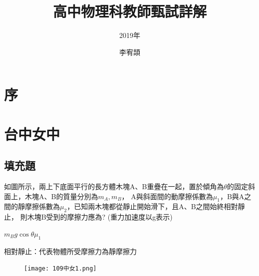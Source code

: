 \documentclass[cn,10pt,math=newtx,chinesefont=founder,device=ig]{elegantbook}
\title{高中物理科教師甄試詳解}
\subtitle{2019年}
\author{李宥頡}
\institute{National Taiwan University}
\begin{document}
\maketitle
\frontmatter

\chapter*{序}



\tableofcontents

\mainmatter

\chapter{台中女中}


\section{填充題}

\begin{example}
  如圖所示，兩上下底面平行的長方體木塊A、B重疊在一起，置於傾角為$\theta$的固定斜面上，木塊A、B的質量分別為$m_A, m_B$，
  A與斜面間的動摩擦係數為$\mu_1$，B與A之間的靜摩擦係數為$\mu_2$，已知兩木塊都從靜止開始滑下，且A、B之間始終相對靜止，
  則木塊B受到的摩擦力應為? (重力加速度以g表示)\\
  \rightline{[台中女中教甄109]}
\end{example}
\begin{solution}
$m_{B}g\cos \theta \mu_1$
\end{solution}
\begin{note}
  相對靜止：代表物體所受摩擦力為靜摩擦力
\end{note}
\begin{figure}[htbp]
  \flushright
  \texttt{[image: 109中女1.png]}
\end{figure}
\newpage
\end{document}
